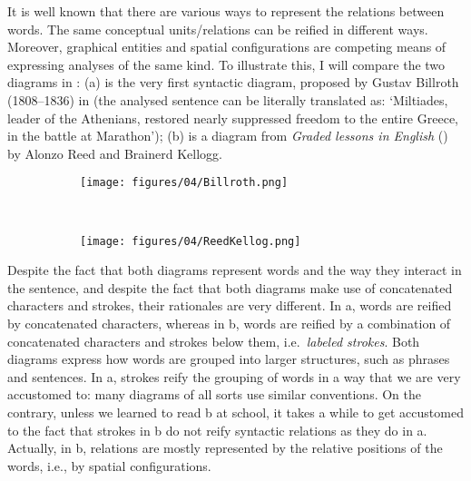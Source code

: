 \documentclass[english,output=paper,colorlinks,citecolor=brown]{../langscibook}
\begin{document}
It is well known that there are various ways to represent the relations between words. The same conceptual units/relations can be reified in different ways. Moreover, graphical entities and spatial configurations are competing means of expressing analyses of the same kind. To illustrate this, I will compare the two diagrams in : (a) is the very first syntactic diagram, proposed by Gustav Billroth (1808–1836) in \citeyear{Billroth1832} (the analysed sentence can be literally translated as: `Miltiades, leader of the Athenians, restored nearly suppressed freedom to the entire Greece, in the battle at Marathon'); (b) is a diagram from \textit{Graded lessons in English} (\citeyear{ReedBrainerd1879}) by Alonzo Reed and Brainerd Kellogg.

\begin{figure}
	\caption{Various values of strokes\label{fig:4:2}}
	\begin{subfigure}[t]{\linewidth}\centering
	\caption{\label{fig:4:2a}\citealt[102]{Billroth1832}}
	  	\texttt{[image: figures/04/Billroth.png]}
        \end{subfigure}\medskip\\%
        \begin{subfigure}[t]{\linewidth}\centering
		\caption{\label{fig:4:2b}\citealt[62]{ReedBrainerd1879}}
		\texttt{[image: figures/04/ReedKellog.png]}
	\end{subfigure}
\end{figure}

Despite the fact that both diagrams represent words and the way they interact in the sentence, and despite the fact that both diagrams make use of concatenated characters and strokes, their rationales are very different. In a, words are reified by concatenated characters, whereas in b, words are reified by a combination of concatenated characters and strokes below them, i.e.~\textit{labeled strokes}. Both diagrams express how words are grouped into larger structures, such as phrases and sentences. In a, strokes reify the grouping of words in a way that we are very accustomed to: many diagrams of all sorts use similar conventions. On the contrary, unless we learned to read b at school, it takes a while to get accustomed to the fact that strokes in b do not reify syntactic relations as they do in a. Actually, in b, relations are mostly represented by the relative positions of the words, i.e., by spatial configurations.
\end{document}
